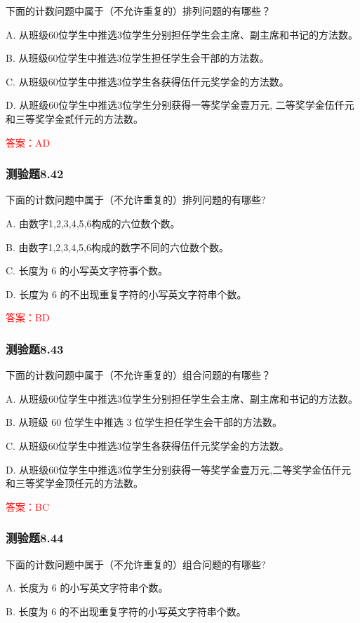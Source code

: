 \documentclass[UTF8, heading=true]{ctexart}
\begin{document}
下面的计数问题中属于（不允许重复的）排列问题的有哪些？

A. 从班级60位学生中推选3位学生分别担任学生会主席、副主席和书记的方法数。

B. 从班级60位学生中推选3位学生担任学生会干部的方法数。

C. 从班级60位学生中推选3位学生各获得伍仟元奖学金的方法数。

D. 从班级60位学生中推选3位学生分别获得一等奖学金壹万元, 二等奖学金伍仟元和三等奖学金贰仟元的方法数。

\textcolor{red}{答案：AD}

\subsubsection{测验题8.42}

下面的计数问题中属于（不允许重复的）排列问题的有哪些?

A. 由数字1,2,3,4,5,6构成的六位数个数。

B. 由数字1,2,3,4,5,6构成的数字不同的六位数个数。

C. 长度为 6 的小写英文字符事个数。

D. 长度为 6 的不出现重复字符的小写英文字符串个数。

\textcolor{red}{答案：BD}

\subsubsection{测验题8.43}

下面的计数问题中属于（不允许重复的）组合问题的有哪些？

A. 从班级60位学生中推选3位学生分别担任学生会主席、副主席和书记的方法数。

B. 从班级 60 位学生中推选 3 位学生担任学生会干部的方法数。

C. 从班级60位学生中推选3位学生各获得伍仟元奖学金的方法数。

D. 从班级60位学生中推选3位学生分别获得一等奖学金壹万元,二等奖学金伍仟元和三等奖学金顶任元的方法数。

\textcolor{red}{答案：BC}

\subsubsection{测验题8.44}

下面的计数问题中属于（不允许重复的）组合问题的有哪些?

A. 长度为 6 的小写英文字符串个数。

B. 长度为 6 的不出现重复字符的小写英文字符串个数。
\end{document}
